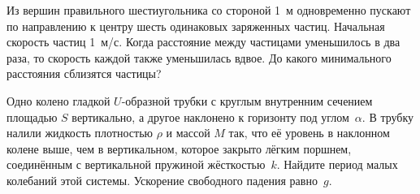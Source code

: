 \AddProb Из вершин правильного шестиугольника со стороной 1~м одновременно пускают по направлению к центру шесть одинаковых заряженных частиц. 
Начальная скорость частиц 1~м/с. Когда расстояние между частицами уменьшилось в два раза, то скорость каждой также уменьшилась вдвое. 
До какого минимального расстояния сблизятся частицы?

\AddProb Одно колено гладкой $U$-образной трубки с круглым внутренним сечением площадью $S$ вертикально, 
а другое наклонено к горизонту под углом~$\alpha$. В трубку налили жидкость плотностью $\rho$ и массой $M$ так, что её уровень в наклонном колене выше, 
чем в вертикальном, которое закрыто лёгким поршнем, соединённым с вертикальной пружиной жёсткостью~$k$. Найдите период малых колебаний этой системы. 
Ускорение свободного падения равно~$g$.